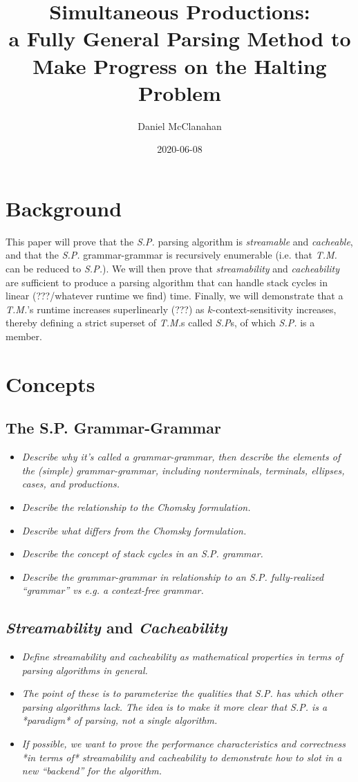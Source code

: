\documentclass{article}
\title{Simultaneous Productions: \\ a Fully General Parsing Method to Make Progress on the Halting Problem}
\date{2020-06-08}
\author{Daniel McClanahan}
\begin{document}
\maketitle
\section{Background}
This paper will prove that the \textit{S.P.} parsing algorithm is \textit{streamable} and \textit{cacheable}, and that the \textit{S.P.} grammar-grammar is recursively enumerable (i.e. that \textit{T.M.} can be reduced to \textit{S.P.}). We will then prove that \textit{streamability} and \textit{cacheability} are sufficient to produce a parsing algorithm that can handle stack cycles in linear (???/whatever runtime we find) time. Finally, we will demonstrate that a \textit{T.M.}'s runtime increases superlinearly (???) as $k$-context-sensitivity increases, thereby defining a strict superset of \textit{T.M.}s called \textit{S.P}s, of which \textit{S.P.} is a member.

\section{Concepts}
\subsection{The S.P. Grammar-Grammar}
\begin{itemize}
  \item \textit{Describe why it's called a grammar-grammar, then describe the elements of the (simple) grammar-grammar, including nonterminals, terminals, ellipses, cases, and productions.}
  \item \textit{Describe the relationship to the Chomsky formulation.}
  \item \textit{Describe what differs from the Chomsky formulation.}
  \item \textit{Describe the concept of stack cycles in an S.P. grammar.}
  \item \textit{Describe the grammar-grammar in relationship to an S.P. fully-realized ``grammar'' vs e.g. a context-free grammar.}
\end{itemize}

\subsection{\textit{Streamability} and \textit{Cacheability}}
\begin{itemize}
  \item \textit{Define streamability and cacheability as mathematical properties in terms of parsing algorithms in general.}
  \item \textit{The point of these is to parameterize the qualities that S.P. has which other parsing algorithms lack. The idea is to make it more clear that S.P. is a *paradigm* of parsing, not a single algorithm.}
  \item \textit{If possible, we want to prove the performance characteristics and correctness *in terms of* streamability and cacheability to demonstrate how to slot in a new ``backend'' for the algorithm.}
\end{itemize}
\end{document}
